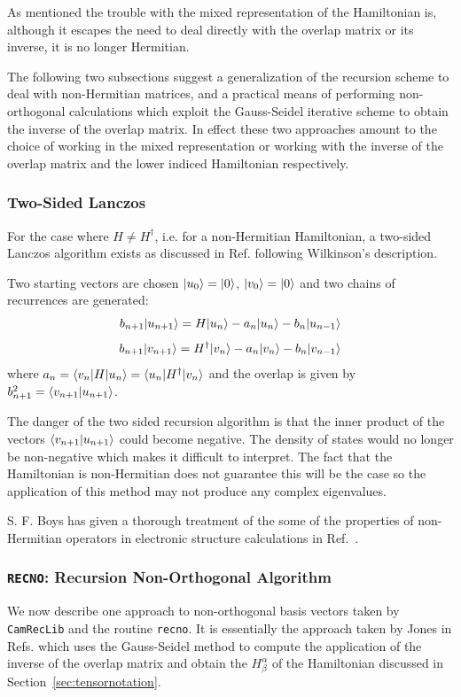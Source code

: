 As mentioned the trouble with the mixed representation of the Hamiltonian is,
although it escapes the need to deal directly with the overlap 
matrix or its inverse, it is no longer Hermitian. 

The following two subsections suggest a generalization of the recursion
scheme to deal with non-Hermitian matrices, and a practical means
of performing non-orthogonal calculations which exploit the Gauss-Seidel
iterative scheme to obtain the inverse of the overlap matrix.
In effect these two approaches amount to the choice of working
in the mixed representation or working with the inverse of the overlap
matrix and the lower indiced Hamiltonian respectively.

\subsubsection{Two-Sided Lanczos}
For the case where $H\neq H^{\dagger}$, i.e. for a non-Hermitian
Hamiltonian, a two-sided Lanczos algorithm exists as discussed in
Ref.\cite{haydockkelly75} following Wilkinson's description.

Two starting vectors are chosen $|u_{0}\rangle=|0\rangle$, $|v_{0}\rangle=|0\rangle$
and two chains of recurrences are generated:
%
\begin{equation}
b_{n+1}|u_{n+1}\rangle = H|u_{n}\rangle - a_{n}|u_{n}\rangle - b_{n}|u_{n-1}\rangle
\end{equation}
%
\begin{equation}
b_{n+1}|v_{n+1}\rangle = H^{\dagger}|v_{n}\rangle - a_{n}|v_{n}\rangle - b_{n}|v_{n-1}\rangle
\end{equation}
%
where $a_{n} = \langle v_{n}|H|u_{n}\rangle = \langle u_{n}|H^{\dagger}|v_{n}\rangle$
and the overlap is given by $b^{2}_{n+1} = \langle v_{n+1}|u_{n+1}\rangle$.

The danger of the two sided recursion algorithm is that the inner
product of the vectors $\langle v_{n+1}|u_{n+1}\rangle$ could become negative.
The density of states would no longer be non-negative which makes it
difficult to interpret. The fact that the Hamiltonian is non-Hermitian 
does not guarantee this will 
be the case so the application of this method may not produce 
any complex eigenvalues. 

S. F. Boys has given a thorough treatment
of the some of the properties of non-Hermitian operators in 
electronic structure calculations in Ref.~\cite{boys69}.

\subsubsection{\texttt{RECNO}: Recursion Non-Orthogonal Algorithm}
We now describe one approach to non-orthogonal basis 
vectors  taken by
\texttt{CamRecLib} and the routine \texttt{recno}.
It is essentially the approach taken by Jones in Refs.\cite{jones84, jones85} which
uses the Gauss-Seidel method to compute the application 
of the inverse of the overlap matrix
and obtain the $H^{\alpha}_{\beta}$ of the Hamiltonian discussed in 
Section~\ref{sec:tensornotation}.

